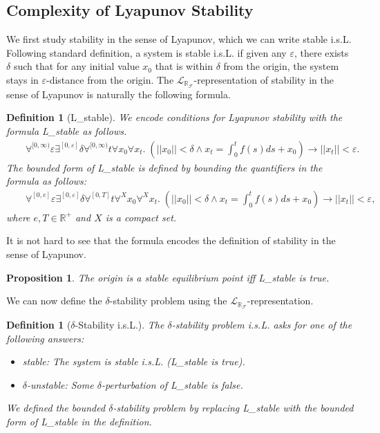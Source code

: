 \documentclass[10pt]{article}
\theoremstyle{plain}
\newtheorem{proposition}[theorem]{Proposition}
\newtheorem{definition}[theorem]{Definition}
\theoremstyle{definition}
\newcommand{\lrf}{\mathcal{L}_{\mathbb{R}_{\mathcal{F}}}}
\begin{document}
\subsection{Complexity of Lyapunov Stability}

We first study stability in the sense of Lyapunov, which we can write stable i.s.L. Following standard definition, a system is stable i.s.L. if given any $\varepsilon$, there exists $\delta$ such that for any initial value $x_0$ that is within $\delta$ from the origin, the system stays in $\varepsilon$-distance from the origin. The $\lrf$-representation of stability in the sense of Lyapunov is naturally the following formula. 
\begin{definition}[{\sf L\_stable}]
We encode conditions for Lyapunov stability with the formula {\sf L\_stable} as follows. 
\begin{eqnarray*}
& &\forall^{[0,\infty)} \varepsilon\exists^{[0,\varepsilon]} \delta \forall^{[0,\infty)} t\forall x_0\forall x_t .\; (||x_0||<\delta \wedge x_t = \int_0^t f(s)ds + x_0 )\rightarrow ||x_t||<\varepsilon.
\end{eqnarray*}
The {\em bounded form} of {\sf L\_stable} is defined by bounding the quantifiers in the formula as follows:
\begin{eqnarray*}
& &\forall^{[0, e]} \varepsilon\exists^{[0,\varepsilon]} \delta \forall^{[0,T]} t\forall^X x_0\forall^X x_t. \;(||x_0||<\delta \wedge x_t = \int_0^t f(s)ds + x_0 )\rightarrow ||x_t||<\varepsilon, 
\end{eqnarray*}
where $e, T\in \mathbb{R}^+$ and $X$ is a compact set.
\end{definition}

It is not hard to see that the formula encodes the definition of stability in the sense of Lyapunov. 
\begin{proposition}
The origin is a stable equilibrium point iff {\sf L\_stable} is true. 
\end{proposition}

We can now define the $\delta$-stability problem using the $\lrf$-representation.  
\begin{definition}[$\delta$-Stability i.s.L.]\label{sl}
The $\delta$-stability problem i.s.L. asks for one of the following answers:
\begin{itemize}
\item {\sf stable}: The system is stable i.s.L. ({\sf L\_stable} is true). 
\item {\sf $\delta$-unstable}: Some $\delta$-perturbation of {\sf L\_stable} is false. 
\end{itemize}
We defined the {\em bounded} $\delta$-stability problem by replacing {\sf L\_stable} with the bounded form of {\sf L\_stable} in the definition. 
\end{definition}
\end{document}
